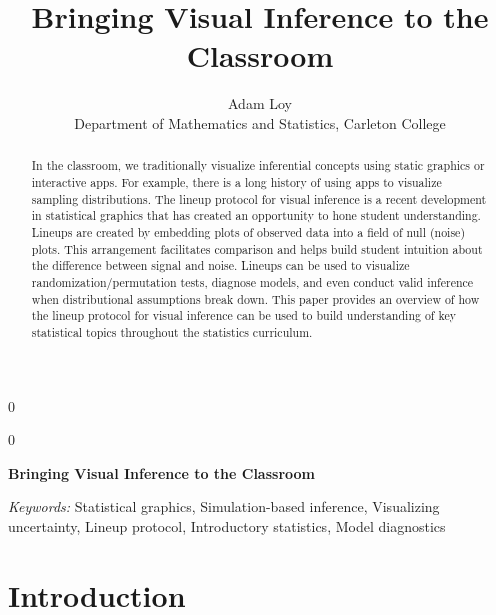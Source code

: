 \documentclass[12pt]{article}
\newcommand{\blind}{0}
\begin{document}
\def\spacingset#1{\renewcommand{\baselinestretch}%
{#1}\small\normalsize} \spacingset{1}



\blind
{
  \title{\bf Bringing Visual Inference to the Classroom}

  \author{
        Adam Loy \\
    Department of Mathematics and Statistics, Carleton College\\
      }
  \maketitle
} \fi

\blind
{
  \bigskip
  \bigskip
  \bigskip
  \begin{center}
    {\LARGE\bf Bringing Visual Inference to the Classroom}
  \end{center}
  \medskip
} \fi

\bigskip
\begin{abstract}
In the classroom, we traditionally visualize inferential concepts using
static graphics or interactive apps. For example, there is a long
history of using apps to visualize sampling distributions. The lineup
protocol for visual inference is a recent development in statistical
graphics that has created an opportunity to hone student understanding.
Lineups are created by embedding plots of observed data into a field of
null (noise) plots. This arrangement facilitates comparison and helps
build student intuition about the difference between signal and noise.
Lineups can be used to visualize randomization/permutation tests,
diagnose models, and even conduct valid inference when distributional
assumptions break down. This paper provides an overview of how the
lineup protocol for visual inference can be used to build understanding
of key statistical topics throughout the statistics curriculum.
\end{abstract}

\noindent%
{\it Keywords:} Statistical graphics, Simulation-based
inference, Visualizing uncertainty, Lineup protocol, Introductory
statistics, Model diagnostics
\vfill

\newpage
\spacingset{1.45} %

\hypertarget{introduction}{%
\section{Introduction}\label{introduction}}
\end{document}

